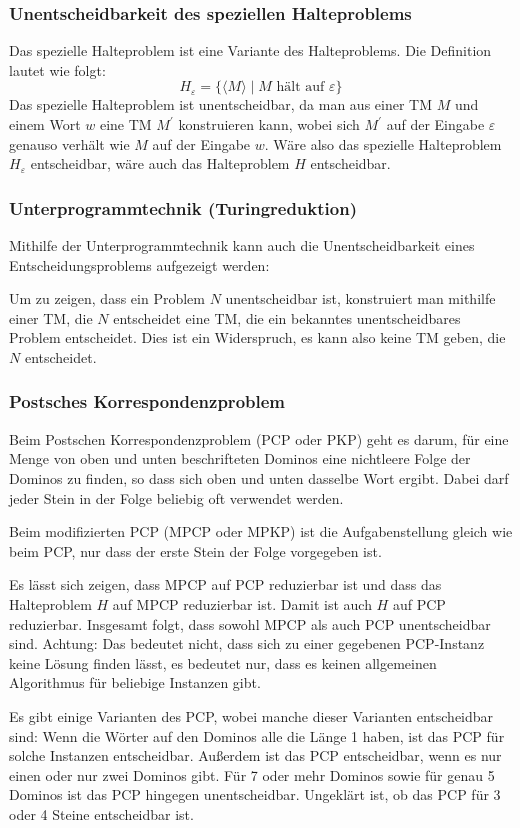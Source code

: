 \documentclass[a4paper,parskip=half*,DIV=7,fontsize=11pt]{scrartcl}
\begin{document}
\subsubsection{Unentscheidbarkeit des speziellen Halteproblems}
Das spezielle Halteproblem ist eine Variante des Halteproblems. Die Definition lautet wie folgt:
\[
H_\varepsilon = \{ \langle M \rangle \mid M \text{ hält auf }\varepsilon \}
\]
Das spezielle Halteproblem ist unentscheidbar, da man aus einer TM $M$ und einem Wort $w$ eine TM $M^\prime$ konstruieren kann, wobei sich $M^\prime$ auf der Eingabe $\varepsilon$ genauso verhält wie $M$ auf der Eingabe $w$. Wäre also das spezielle Halteproblem $H_\varepsilon$ entscheidbar, wäre auch das Halteproblem $H$ entscheidbar.
\subsubsection{Unterprogrammtechnik (Turingreduktion)}
Mithilfe der Unterprogrammtechnik kann auch die  Unentscheidbarkeit eines Entscheidungsproblems aufgezeigt werden:

Um zu zeigen, dass ein Problem $N$ unentscheidbar ist, konstruiert man mithilfe einer TM, die $N$ entscheidet eine TM, die ein bekanntes unentscheidbares Problem entscheidet. Dies ist ein Widerspruch, es kann also keine TM geben, die $N$ entscheidet.

\subsubsection{Postsches Korrespondenzproblem}
Beim Postschen Korrespondenzproblem (PCP oder PKP) geht es darum, für eine Menge von oben und unten beschrifteten Dominos eine nichtleere Folge der Dominos zu finden, so dass sich oben und unten dasselbe Wort ergibt. Dabei darf jeder Stein in der Folge beliebig oft verwendet werden.

Beim modifizierten PCP (MPCP oder MPKP) ist die Aufgabenstellung gleich wie beim PCP, nur dass der erste Stein der Folge vorgegeben ist.

Es lässt sich zeigen, dass MPCP auf PCP reduzierbar ist und dass das Halteproblem $H$ auf MPCP reduzierbar ist. Damit ist auch $H$ auf PCP reduzierbar. Insgesamt folgt, dass sowohl MPCP als auch PCP unentscheidbar sind. Achtung: Das bedeutet nicht, dass sich zu einer gegebenen PCP-Instanz keine Lösung finden lässt, es bedeutet nur, dass es keinen allgemeinen Algorithmus für beliebige Instanzen gibt.

Es gibt einige Varianten des PCP, wobei manche dieser Varianten entscheidbar sind:
Wenn die Wörter auf den Dominos alle die Länge 1 haben, ist das PCP für solche Instanzen entscheidbar. Außerdem ist das PCP entscheidbar, wenn es nur einen oder nur zwei Dominos gibt. Für 7 oder mehr Dominos sowie für genau 5 Dominos ist das PCP hingegen unentscheidbar. Ungeklärt ist, ob das PCP für 3 oder 4 Steine entscheidbar ist.
\end{document}
